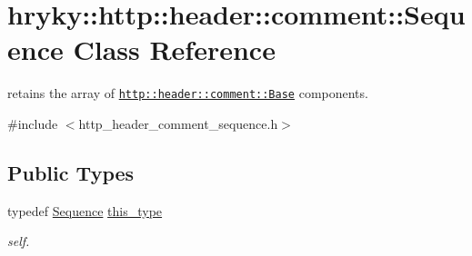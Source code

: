 \hypertarget{classhryky_1_1http_1_1header_1_1comment_1_1_sequence}{\section{hryky\-:\-:http\-:\-:header\-:\-:comment\-:\-:Sequence Class Reference}
\label{classhryky_1_1http_1_1header_1_1comment_1_1_sequence}
}


retains the array of \href{http::header::comment::Base}{\tt http\-::header\-::comment\-::\-Base} components.  




{\ttfamily \#include $<$http\-\_\-header\-\_\-comment\-\_\-sequence.\-h$>$}

\subsection*{Public Types}
\begin{DoxyCompactItemize}
\item 
\hypertarget{classhryky_1_1http_1_1header_1_1comment_1_1_sequence_a7907326adb8e22a86633e398acc9bf08}{typedef \hyperlink{classhryky_1_1http_1_1header_1_1comment_1_1_sequence}{Sequence} \hyperlink{classhryky_1_1http_1_1header_1_1comment_1_1_sequence_a7907326adb8e22a86633e398acc9bf08}{this\-\_\-type}}\label{classhryky_1_1http_1_1header_1_1comment_1_1_sequence_a7907326adb8e22a86633e398acc9bf08}

\begin{DoxyCompactList}\small\item\em self. \end{DoxyCompactList}\end{DoxyCompactItemize}
